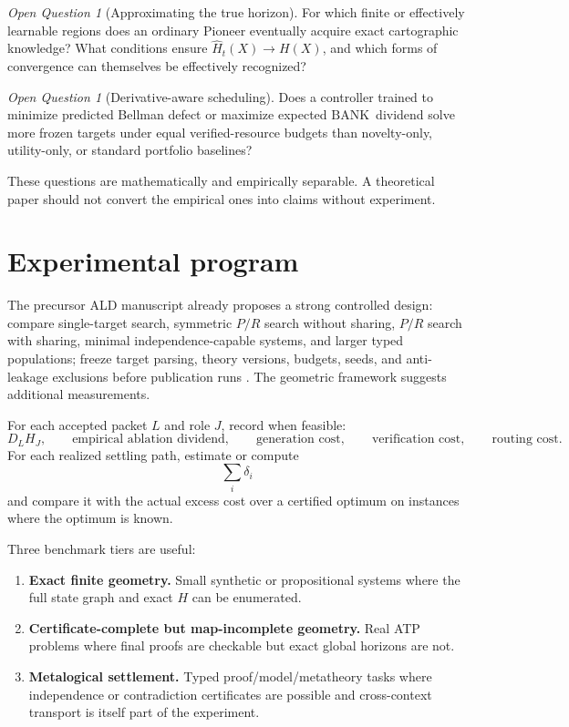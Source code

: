 \documentclass[11pt]{article}
\theoremstyle{remark}
\newtheorem{question}[definition]{Open Question}
\newcommand{\BANK}{\ensuremath{\mathrm{BANK}}}
\begin{document}
\begin{question}[Approximating the true horizon]
For which finite or effectively learnable regions does an ordinary Pioneer eventually acquire exact cartographic knowledge? What conditions ensure $\widehat H_t(X)\to H(X)$, and which forms of convergence can themselves be effectively recognized?
\end{question}

\begin{question}[Derivative-aware scheduling]
Does a controller trained to minimize predicted Bellman defect or maximize expected \BANK\ dividend solve more frozen targets under equal verified-resource budgets than novelty-only, utility-only, or standard portfolio baselines?
\end{question}

These questions are mathematically and empirically separable. A theoretical paper should not convert the empirical ones into claims without experiment.

\section{Experimental program}

The precursor ALD manuscript already proposes a strong controlled design: compare single-target search, symmetric $P/R$ search without sharing, $P/R$ search with sharing, minimal independence-capable systems, and larger typed populations; freeze target parsing, theory versions, budgets, seeds, and anti-leakage exclusions before publication runs \cite{TennesonCSII}. The geometric framework suggests additional measurements.

For each accepted packet $L$ and role $J$, record when feasible:
\[
D_LH_J,
\qquad
\text{empirical ablation dividend},
\qquad
\text{generation cost},
\qquad
\text{verification cost},
\qquad
\text{routing cost}.
\]
For each realized settling path, estimate or compute
\[
\sum_i\delta_i
\]
and compare it with the actual excess cost over a certified optimum on instances where the optimum is known.

Three benchmark tiers are useful:
\begin{enumerate}
\item \textbf{Exact finite geometry.} Small synthetic or propositional systems where the full state graph and exact $H$ can be enumerated.
\item \textbf{Certificate-complete but map-incomplete geometry.} Real ATP problems where final proofs are checkable but exact global horizons are not.
\item \textbf{Metalogical settlement.} Typed proof/model/metatheory tasks where independence or contradiction certificates are possible and cross-context transport is itself part of the experiment.
\end{enumerate}
\end{document}
